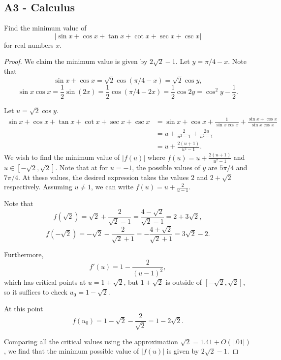 \documentclass[11pt]{scrartcl}
\newcommand{\<}{\langle}
\renewcommand{\>}{\rangle}
\begin{document}
\subsection{A3 - Calculus}
Find the minimum value of\[|\sin{x} + \cos{x} + \tan{x} + \cot{x} + \sec{x} + \csc{x}|\]for real numbers $x$.
\begin{proof}
We claim the minimum value is given by $2\sqrt{2} - 1$.  Let $y = \pi/4 - x$.  Note that $$\sin{x} + \cos{x} = \sqrt{2} \cos(\pi/4 - x) = \sqrt{2} \cos y,$$
$$\sin{x} \cos{x} = \frac{1}{2} \sin(2x) = \frac{1}{2} \cos(\pi/4 - 2x) = \frac{1}{2} \cos{2y} = \cos^2 y - \frac{1}{2}.$$

Let $u = \sqrt{2} \cos y$.  
\begin{align*}
\sin x + \cos x + \tan x + \cot x + \sec x + \csc x &= \sin x + \cos x + \frac{1}{\sin x \cos x} + \frac{\sin x + \cos x}{\sin x \cos x} \\
&= u + \frac{2}{u^2 - 1} + \frac{2u}{u^2 - 1} \\
&= u + \frac{2(u + 1)}{u^2 - 1}.
\end{align*}
We wish to find the minimum value of $|f(u)|$ where $f(u) =  u + \frac{2(u + 1)}{u^2 - 1} $ and $u \in [-\sqrt{2}, \sqrt{2}]$.  Note that at for $u = -1$, the possible values of $y$ are $5\pi/4$ and $7\pi/4$.  At these values, the desired expression takes the values $2$ and $2 + \sqrt{2}$ respectively.  Assuming $u \ne 1$, we can write $f(u) = u + \frac{2}{u-1}$.  

Note that $$f(\sqrt{2}) = \sqrt{2} + \frac{2}{\sqrt{2} - 1} = \frac{4 - \sqrt{2}}{\sqrt{2} - 1} = 2 + 3\sqrt{2},$$
$$f(-\sqrt{2}) = -\sqrt{2} - \frac{2}{\sqrt{2} + 1} = -\frac{4 + \sqrt{2}}{\sqrt{2} + 1} = 3\sqrt{2} - 2.$$

Furthermore, $$f'(u) = 1 - \frac{2}{(u - 1)^2},$$
which has critical points at $u = 1 \pm \sqrt{2}$, but $1 + \sqrt{2}$ is outside of $[-\sqrt{2}, \sqrt{2}]$, so it suffices to check $u_0 = 1 - \sqrt{2}$.

At this point $$f(u_0) = 1 - \sqrt{2 } - \frac{2}{ \sqrt{2}} = 1 - 2\sqrt{2}.$$

Comparing all the critical values using the approximation $\sqrt{2} = 1.41 + O(|.01|)$, we find that the minimum possible value of $|f(u)|$ is given by $2\sqrt{2} - 1$.

\end{proof}
\pagebreak
\end{document}
